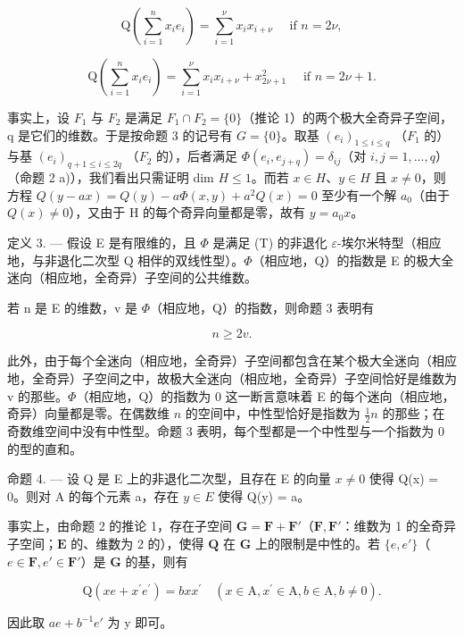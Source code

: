 \[
\mathrm{Q} (\sum_ {i = 1} ^ {n} x _ {i} e _ {i}) = \sum_ {i = 1} ^ {\nu} x _ {i} x _ {i + \nu} \quad \text {   if   } n = 2 \nu ,\tag{3}
\]

\[
\mathrm{Q} \left(\sum_ {i = 1} ^ {n} x _ {i} e _ {i}\right) = \sum_ {i = 1} ^ {\nu} x _ {i} x _ {i + \nu} + x _ {2 \nu + 1} ^ {2} \quad \text {   if   } n = 2 \nu + 1.
\]

事实上，设 \(F_{1}\) 与 \(F_{2}\) 是满足 \(F_{1} \cap F_{2} = \{0\}\)（推论 1）的两个极大全奇异子空间，q 是它们的维数。于是按命题 3 的记号有 \(G = \{0\}\)。取基 \((e_{i})_{1 \leqslant i \leqslant q}\) （\(F_{1}\) 的）与基 \((e_{i})_{q+1 \leqslant i \leqslant 2q}\) （\(F_{2}\) 的），后者满足 \(\Phi(e_{i}, e_{j+q}) = \delta_{ij}\)（对 \(i, j = 1, \ldots, q\)）（命题 2 a)），我们看出只需证明 dim \(H \leqslant 1\)。而若 \(x \in H\)、\(y \in H\) 且 \(x \neq 0\)，则方程 \(Q(y - ax) = Q(y) - a\Phi(x, y) + a^{2}Q(x) = 0\) 至少有一个解 \(a_{0}\)（由于 \(Q(x) \neq 0\)），又由于 H 的每个奇异向量都是零，故有 \(y = a_{0}x\)。

定义 3. --- 假设 E 是有限维的，且 \(\Phi\) 是满足 (T) 的非退化 \(\varepsilon\)-埃尔米特型（相应地，与非退化二次型 Q 相伴的双线性型）。\(\Phi\)（相应地，Q）的指数是 E 的极大全迷向（相应地，全奇异）子空间的公共维数。

若 n 是 E 的维数，v 是 \(\Phi\)（相应地，Q）的指数，则命题 3 表明有

\[
n \geqslant 2 v.\tag{4}
\]

此外，由于每个全迷向（相应地，全奇异）子空间都包含在某个极大全迷向（相应地，全奇异）子空间之中，故极大全迷向（相应地，全奇异）子空间恰好是维数为 v 的那些。\(\Phi\)（相应地，Q）的指数为 0 这一断言意味着 E 的每个迷向（相应地，奇异）向量都是零。在偶数维 \(n\) 的空间中，中性型恰好是指数为 \(\frac{1}{2} n\) 的那些；在奇数维空间中没有中性型。命题 3 表明，每个型都是一个中性型与一个指数为 0 的型的直和。

命题 4. --- 设 Q 是 E 上的非退化二次型，且存在 E 的向量 \(x \neq 0\) 使得 Q(x) = 0。则对 A 的每个元素 a，存在 \(y \in E\) 使得 Q(y) = a。

事实上，由命题 2 的推论 1，存在子空间 \(\mathbf{G} = \mathbf{F} + \mathbf{F}'\)（\(\mathbf{F}, \mathbf{F}'\)：维数为 1 的全奇异子空间；\(\mathbf{E}\) 的、维数为 2 的），使得 \(\mathbf{Q}\) 在 \(\mathbf{G}\) 上的限制是中性的。若 \(\{e, e'\}\)（\(e \in \mathbf{F}, e' \in \mathbf{F}'\)）是 \(\mathbf{G}\) 的基，则有

\[
\mathrm{Q} (x e + x ^ {\prime} e ^ {\prime}) = b x x ^ {\prime} \quad (x \in \mathrm{A}, x ^ {\prime} \in \mathrm{A}, b \in \mathrm{A}, b \neq 0).
\]

因此取 \(ae + b^{-1}e'\) 为 y 即可。
